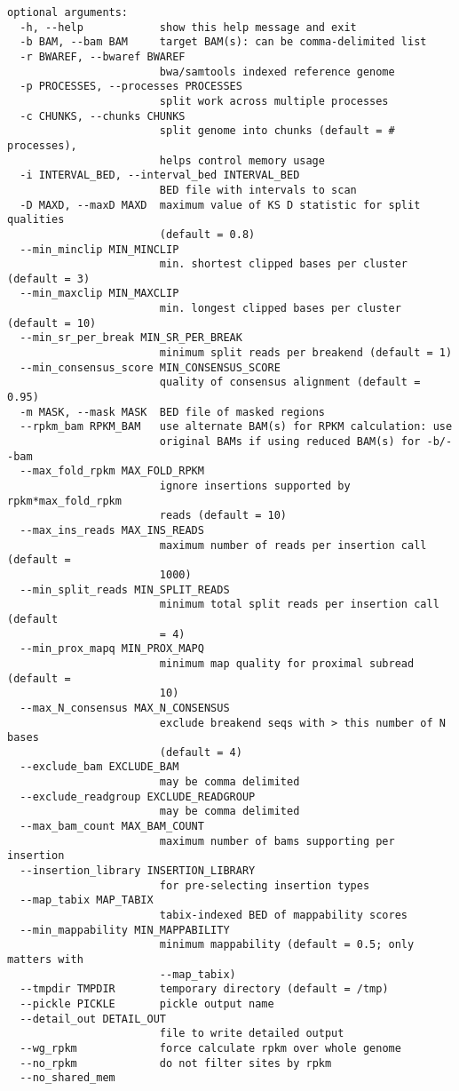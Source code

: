 \documentclass[letterpaper,11pt]{article}
\begin{document}
\begin{verbatim}
optional arguments:
  -h, --help            show this help message and exit
  -b BAM, --bam BAM     target BAM(s): can be comma-delimited list
  -r BWAREF, --bwaref BWAREF
                        bwa/samtools indexed reference genome
  -p PROCESSES, --processes PROCESSES
                        split work across multiple processes
  -c CHUNKS, --chunks CHUNKS
                        split genome into chunks (default = # processes),
                        helps control memory usage
  -i INTERVAL_BED, --interval_bed INTERVAL_BED
                        BED file with intervals to scan
  -D MAXD, --maxD MAXD  maximum value of KS D statistic for split qualities
                        (default = 0.8)
  --min_minclip MIN_MINCLIP
                        min. shortest clipped bases per cluster (default = 3)
  --min_maxclip MIN_MAXCLIP
                        min. longest clipped bases per cluster (default = 10)
  --min_sr_per_break MIN_SR_PER_BREAK
                        minimum split reads per breakend (default = 1)
  --min_consensus_score MIN_CONSENSUS_SCORE
                        quality of consensus alignment (default = 0.95)
  -m MASK, --mask MASK  BED file of masked regions
  --rpkm_bam RPKM_BAM   use alternate BAM(s) for RPKM calculation: use
                        original BAMs if using reduced BAM(s) for -b/--bam
  --max_fold_rpkm MAX_FOLD_RPKM
                        ignore insertions supported by rpkm*max_fold_rpkm
                        reads (default = 10)
  --max_ins_reads MAX_INS_READS
                        maximum number of reads per insertion call (default =
                        1000)
  --min_split_reads MIN_SPLIT_READS
                        minimum total split reads per insertion call (default
                        = 4)
  --min_prox_mapq MIN_PROX_MAPQ
                        minimum map quality for proximal subread (default =
                        10)
  --max_N_consensus MAX_N_CONSENSUS
                        exclude breakend seqs with > this number of N bases
                        (default = 4)
  --exclude_bam EXCLUDE_BAM
                        may be comma delimited
  --exclude_readgroup EXCLUDE_READGROUP
                        may be comma delimited
  --max_bam_count MAX_BAM_COUNT
                        maximum number of bams supporting per insertion
  --insertion_library INSERTION_LIBRARY
                        for pre-selecting insertion types
  --map_tabix MAP_TABIX
                        tabix-indexed BED of mappability scores
  --min_mappability MIN_MAPPABILITY
                        minimum mappability (default = 0.5; only matters with
                        --map_tabix)
  --tmpdir TMPDIR       temporary directory (default = /tmp)
  --pickle PICKLE       pickle output name
  --detail_out DETAIL_OUT
                        file to write detailed output
  --wg_rpkm             force calculate rpkm over whole genome
  --no_rpkm             do not filter sites by rpkm
  --no_shared_mem

\end{verbatim}
\end{document}
